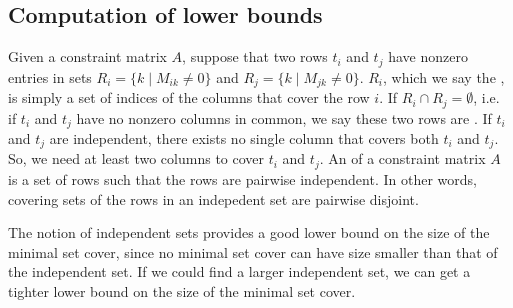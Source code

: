 \documentclass{note}
\begin{document}
\subsection{Computation of lower bounds}
Given a constraint matrix $A$, suppose that two rows $t_i$ and 
$t_j$ have nonzero entries in sets 
$R_i = \{k \mid M_{ik} \ne 0\}$ and
$R_j = \{k \mid M_{jk} \ne 0\}$.
$R_i$, which we say the , 
is simply a set of indices of the columns that cover the
row $i$.
If $R_i \cap R_j = \emptyset$, i.e. if $t_i$ and $t_j$ have
no nonzero columns in common, we say these two rows
are . 
If $t_i$ and $t_j$ are independent, there exists no single column
that covers both $t_i$ and $t_j$. So, we need at least two
columns to cover $t_i$ and $t_j$.
An  of a constraint matrix $A$ is a set
of rows such that the rows are pairwise independent.
In other words, covering sets of the rows in an indepedent set are 
pairwise disjoint.

The notion of independent sets provides a good lower bound
on the size of the minimal set cover, since no minimal set cover
can have size smaller than that of the independent set.
If we could find a larger independent set, we can get a tighter
lower bound on the size of the minimal set cover.






\nocite{Hochbaum97a,Rudell89,HS96}
\pagebreak
\tableofcontents
\end{document}
